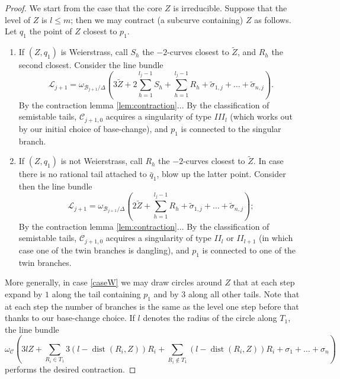 \documentclass[11pt]{amsart}
\newcommand{\dvr}{\Delta}
\theoremstyle{plain}
\theoremstyle{definition}
\begin{document}
\begin{proof}
  We start from the case that the core $Z$ is irreducible. Suppose that the level of $Z$ is $l\leq m$; then we may contract (a subcurve containing) $Z$ as follows. Let $q_1$ the point of $Z$ closest to $p_1$.
 \begin{enumerate}
  \item\label{caseW} If $(Z,q_1)$ is Weierstrass, call $S_h$ the $-2$-curves closest to $\tilde Z$, and $R_h$ the second closest. Consider the line bundle
  \[\mathcal L_{j+1}=\omega_{\mathcal B_{j+1}/\dvr}(3\tilde Z+2\sum_{h=1}^{l_j-1}S_h+\sum_{h=1}^{l_j-1}R_h+\tilde \sigma_{1,j}+\ldots+\tilde\sigma_{n,j}).\]
  By the contraction lemma \ref{lem:contraction}... By the classification of semistable tails, $\mathcal C_{j+1,0}$ acquires a singularity of type $I\!I\!I_{l}$ (which works out by our initial choice of base-change), and $p_1$ is connected to the singular branch.
  \item\label{casenW} If $(Z,q_1)$ is not Weierstrass, call $R_h$ the $-2$-curves closest to $\tilde Z$. In case there is no rational tail attached to $\bar q_1$, blow up the latter point. Consider then the line bundle
  \[\mathcal L_{j+1}=\omega_{\mathcal B_{j+1}/\dvr}(2\tilde Z+\sum_{h=1}^{l_j-1}R_h+\tilde \sigma_{1,j}+\ldots+\tilde\sigma_{n,j});\]
  By the contraction lemma \ref{lem:contraction}... By the classification of semistable tails, $\mathcal C_{j+1,0}$ acquires a singularity of type $I\!I_{l}$ or $I\!I_{l+1}$ (in which case one of the twin branches is dangling), and $p_1$ is connected to one of the twin branches.
 \end{enumerate}
 More generally, in case \ref{caseW} we may draw circles around $Z$ that at each step expand by $1$ along the tail containing $p_1$ and by $3$ along all other tails. Note that at each step the number of branches is the same as the level one step before that thanks to our base-change choice. If $l$ denotes the radius of the circle along $T_1$, the line bundle
 \[\omega_{\mathcal C}\left(3lZ+\sum_{R_i\in T_1}3(l-\operatorname{dist}(R_i,Z))R_i+\sum_{R_i\not\in T_1}(l-\operatorname{dist}(R_i,Z))R_i+\sigma_1+\ldots+\sigma_n\right)\]
 performs the desired contraction.
  

\end{proof}
\end{document}
